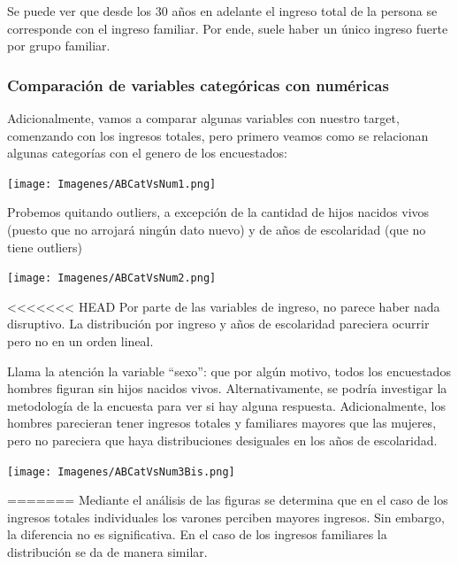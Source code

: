 \documentclass[a4paper]{article}
\begin{document}
            Se puede ver que desde los 30 años en adelante el ingreso total de la persona se corresponde con el ingreso familiar. Por ende, suele haber un único ingreso fuerte por grupo familiar.
 
        \subsubsection{Comparación de variables categóricas con numéricas}
 
            Adicionalmente, vamos a comparar algunas variables con nuestro target, comenzando con los ingresos totales, pero primero veamos como se relacionan algunas categorías con el genero de los encuestados:
 
            \begin{center}
                \texttt{[image: Imagenes/ABCatVsNum1.png]}
            \end{center}
 
            Probemos quitando outliers, a excepción de la cantidad de hijos nacidos vivos (puesto que no arrojará ningún dato nuevo) y de años de escolaridad (que no tiene outliers)
 
            \begin{center}
                \texttt{[image: Imagenes/ABCatVsNum2.png]}
            \end{center}
 
<<<<<<< HEAD
            Por parte de las variables de ingreso, no parece haber nada disruptivo. La distribución por ingreso y años de escolaridad pareciera ocurrir pero no en un orden lineal.
 
            Llama la atención la variable ``sexo'': que por algún motivo, todos los encuestados hombres figuran sin hijos nacidos vivos. Alternativamente, se podría investigar la metodología de la encuesta para ver si hay alguna respuesta. Adicionalmente, los hombres parecieran tener ingresos totales y familiares mayores que las mujeres, pero no pareciera que haya distribuciones desiguales en los años de escolaridad.
 
            \begin{center}
                \texttt{[image: Imagenes/ABCatVsNum3Bis.png]}
            \end{center}
=======
            Mediante el análisis de las figuras se determina que en el caso de los ingresos totales individuales los varones perciben mayores ingresos. Sin embargo, la diferencia no es significativa. En el caso de los ingresos familiares la distribución se da de manera similar. 
\end{document}
